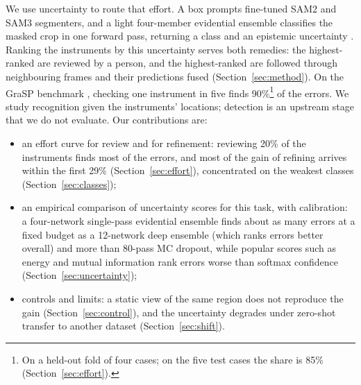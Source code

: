We use uncertainty to route that effort.
A box prompts fine-tuned SAM2 and SAM3 segmenters, and a light four-member evidential ensemble classifies the masked crop in one forward pass, returning a class and an epistemic uncertainty \citep{sensoy2018evidential,duan2024evidential}.
Ranking the instruments by this uncertainty serves both remedies: the highest-ranked are reviewed by a person, and the highest-ranked are followed through neighbouring frames and their predictions fused (Section~\ref{sec:method}).
On the GraSP benchmark \citep{ayobi2024pixel}, checking one instrument in five finds 90\%\footnote{On a held-out fold of four cases; on the five test cases the share is 85\% (Section~\ref{sec:effort}).} of the errors.
We study recognition given the instruments' locations; detection is an upstream stage that we do not evaluate.
Our contributions are:
\begin{itemize}
\item an effort curve for review and for refinement: reviewing 20\% of the instruments finds most of the errors, and most of the gain of refining arrives within the first 29\% (Section~\ref{sec:effort}), concentrated on the weakest classes (Section~\ref{sec:classes});
\item an empirical comparison of uncertainty scores for this task, with calibration: a four-network single-pass evidential ensemble finds about as many errors at a fixed budget as a 12-network deep ensemble (which ranks errors better overall) and more than 80-pass MC dropout, while popular scores such as energy and mutual information rank errors worse than softmax confidence (Section~\ref{sec:uncertainty});
\item controls and limits: a static view of the same region does not reproduce the gain (Section~\ref{sec:control}), and the uncertainty degrades under zero-shot transfer to another dataset (Section~\ref{sec:shift}).
\end{itemize}
